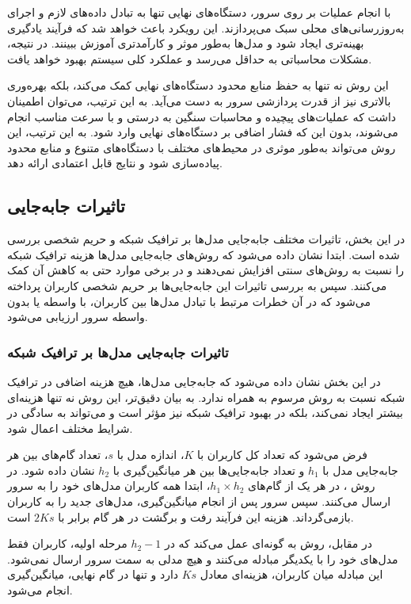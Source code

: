 با انجام عملیات بر روی سرور، دستگاه‌های نهایی تنها به تبادل داده‌های لازم و اجرای به‌روزرسانی‌های محلی سبک می‌پردازند. این رویکرد باعث خواهد شد که فرآیند یادگیری بهینه‌تری ایجاد شود و مدل‌ها به‌طور موثر و کارآمدتری آموزش ببینند. در نتیجه، مشکلات محاسباتی به حداقل می‌رسد و عملکرد کلی سیستم بهبود خواهد یافت.

این روش نه تنها به حفظ منابع محدود دستگاه‌های نهایی کمک می‌کند، بلکه بهره‌وری بالاتری نیز از قدرت پردازشی سرور به دست می‌آید. به این ترتیب، می‌توان اطمینان داشت که عملیات‌های پیچیده و محاسبات سنگین به درستی و با سرعت مناسب انجام می‌شوند، بدون این که فشار اضافی بر دستگاه‌های نهایی وارد شود. به این ترتیب، این روش می‌تواند به‌طور موثری در محیط‌های مختلف با دستگاه‌های متنوع و منابع محدود پیاده‌سازی شود و نتایج قابل اعتمادی ارائه دهد.




\subsection{تاثیرات جابه‌جایی}

در این بخش، تاثیرات مختلف جابه‌جایی مدل‌ها بر ترافیک شبکه و حریم شخصی بررسی شده است. ابتدا نشان داده می‌شود که روش‌های جابه‌جایی مدل‌ها هزینه ترافیک شبکه را نسبت به روش‌های سنتی افزایش نمی‌دهند و در برخی موارد حتی به کاهش آن کمک می‌کنند. سپس به بررسی تاثیرات این جابه‌جایی‌ها بر حریم شخصی کاربران پرداخته می‌شود که در آن خطرات مرتبط با تبادل مدل‌ها بین کاربران، با واسطه یا بدون واسطه سرور ارزیابی می‌شود.

\subsubsection{تاثیرات جابه‌جایی مدل‌ها بر ترافیک شبکه}
در این بخش نشان داده می‌شود که
جابه‌جایی مدل‌ها، هیچ هزینه اضافی در ترافیک شبکه نسبت به روش مرسوم  به همراه ندارد. به بیان دقیق‌تر، این روش نه تنها هزینه‌ای بیشتر ایجاد نمی‌کند، بلکه در بهبود ترافیک شبکه نیز مؤثر است و می‌تواند به سادگی در شرایط مختلف اعمال شود. 


فرض می‌شود که تعداد کل کاربران با \(K\)، اندازه مدل با \(s\)، تعداد گام‌های بین هر جابه‌جایی مدل با \(h_1\) و تعداد جابه‌جایی‌ها بین هر میانگین‌گیری با \(h_2\) نشان داده شود.
در روش ، در هر یک از گام‌های \( h_1 \times h_2 \)، ابتدا همه کاربران مدل‌های خود را به سرور ارسال می‌کنند. سپس سرور پس از انجام میانگین‌گیری، مدل‌های جدید را به کاربران بازمی‌گرداند. هزینه این فرآیند رفت و برگشت در هر گام برابر با \( 2Ks \) است.

در مقابل، روش  به گونه‌ای عمل می‌کند که در \( h_2 - 1 \) مرحله اولیه، کاربران فقط مدل‌های خود را با یکدیگر مبادله می‌کنند و هیچ مدلی به سمت سرور ارسال نمی‌شود. این مبادله میان کاربران، هزینه‌ای معادل \( Ks \) دارد و تنها در گام نهایی، میانگین‌گیری انجام می‌شود.

